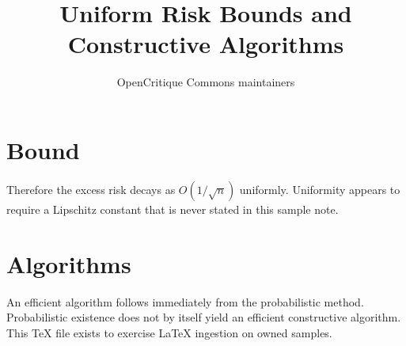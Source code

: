 \documentclass{article}
\begin{document}
\title{Uniform Risk Bounds and Constructive Algorithms}
\author{OpenCritique Commons maintainers}
\maketitle

\section{Bound}
Therefore the excess risk decays as $O(1/\sqrt{n})$ uniformly.
Uniformity appears to require a Lipschitz constant that is never stated in this
sample note.

\section{Algorithms}
An efficient algorithm follows immediately from the probabilistic method.
Probabilistic existence does not by itself yield an efficient constructive
algorithm. This TeX file exists to exercise LaTeX ingestion on owned samples.
\end{document}
